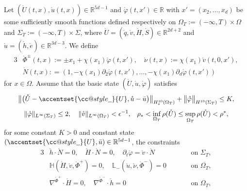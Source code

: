 \documentclass[twoside,11pt]{article}
\makeatletter
\numberwithin{equation}{section}
\def\p{\partial}
\def\widebar{\accentset{{\cc@style\underline{\mskip10mu}}}}
\makeatother
\begin{document}
Let $(\mathring{U}(t,x), \mathring{u}(t,x))  \in \mathbb{R}^{5d-1}$ and $\mathring{\varphi}(t,x')\in\mathbb{R}$ with $x'=(x_2,\ldots,x_d)$ be some sufficiently smooth functions defined respectively on $\Omega_T:=(-\infty,T)\times \Omega$ and $\Sigma_T:=(-\infty,T)\times \Sigma$,
where $\mathring{U}=(\mathring{q} ,\mathring{v},\mathring{H},\mathring{S})\in\mathbb{R}^{2d+2}$ and $\mathring{u}=(\mathring{h},\mathring{e}) \in \mathbb{R}^{3d-3}$.
We define %
	\begin{alignat}{3}\nonumber
	&\mathring{\Phi}^{\pm}(t,x):={\pm}x_1+\chi(x_1)\mathring{\varphi}(t,x'),\quad  \mathring{\nu}(t,x):=\chi(x_1)\mathring{v}(t,0,x'),\\[1mm]
	&\mathring{N}(t,x):%
	=\left(1,  -\chi(x_1)\p_2\mathring{\varphi}(t,x') ,\ldots, -\chi(x_1)\p_d\mathring{\varphi}(t,x') \right)
	\label{N.ring:def}
	\end{alignat}
	for $x\in \Omega.$
	Assume that the basic state $(\mathring{U},\mathring{u},\mathring{\varphi})$  satisfies
\begin{gather}
	\label{bas1}
	 	 \big\|  \big( \mathring{U}-\widebar{U}, \mathring{u}-\bar{u}\big) \big\|_{H_*^{10}(\Omega_{T})} +\big\|\mathring{\varphi} \big\|_{H^{10}(\Sigma_{T})}
	\leq K,\\[1mm] 	
		\|\mathring{\varphi}\|_{L^{\infty}(\Sigma_T)}\leq
	2,
	\quad
{	\|\mathring{v}\|_{L^{\infty}(\Omega_{T})}<\epsilon^{-1},\quad }
	\label{bas2}
	\rho_*<\inf_{\Omega_{T}} \rho(\mathring{U})\leq \sup_{\Omega_{T}} \rho(\mathring{U})<\rho^*,
\end{gather}
for some constant $K>0$ {and constant state $(\widebar{U},\bar{u})\in\mathbb{R}^{5d-1}$},
the constraints
	\begin{alignat}{3}
		\label{bas3}
	&	 \mathring{h}\cdot \mathring{N}=0,
		\quad  \mathring{H}\cdot \mathring{N}=0,
\quad \p_t \mathring{\varphi}=\mathring{v}\cdot \mathring{N}
&&		\qquad  \textrm{on }\Sigma_T,\\[1mm]
		\label{bas4}
&		 \mathbb{H}(\mathring{H},\mathring{v},\mathring{\Phi}^+) =0,\quad
 {\mathbb{L}_-(\mathring{u},\mathring{\nu},\mathring{\Phi}^-) =0}
&&		\qquad   \textrm{on }\overline{\Omega_T},\\[1mm]
		\label{bas5}
&			\nabla^{\mathring{\Phi}^+}\cdot \mathring{H}=0	,\quad
		\nabla^{\mathring{\Phi}^-}\cdot \mathring{h}=0
&&		\qquad   \textrm{on }{\Omega_T},
	\end{alignat}
\end{document}
